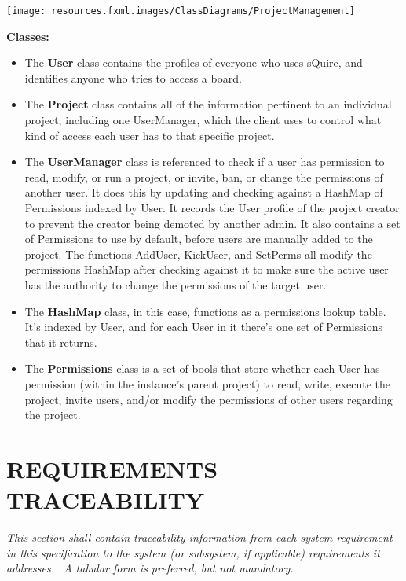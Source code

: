 \documentclass[twoside,letterpaper]{article}
\begin{document}
{\texttt{[image: resources.fxml.images/ClassDiagrams/ProjectManagement]}

\textbf{Classes:}
\begin{itemize}

	\item The \textbf{User} class contains the profiles of everyone who uses sQuire, and identifies anyone who tries to access a board.
	\item The \textbf{Project} class contains all of the information pertinent to an individual project, including one UserManager, which the client uses to control what kind of access each user has to that specific project.
	\item The \textbf{UserManager} class is referenced to check if a user has permission to read, modify, or run a project, or invite, ban, or change the permissions of another user. It does this by updating and checking against a HashMap of Permissions indexed by User. It records the User profile of the project creator to prevent the creator being demoted by another admin. It also contains a set of Permissions to use by default, before users are manually added to the project.
	The functions AddUser, KickUser, and SetPerms all modify the permissions HashMap after checking against it to make sure the active user has the authority to change the permissions of the target user.
	\item The \textbf{HashMap} class, in this case, functions as a permissions lookup table. It's indexed by User, and for each User in it there's one set of Permissions that it returns.
	\item The \textbf{Permissions} class is a set of bools that store whether each User has permission (within the instance's parent project) to read, write, execute the project, invite users, and/or modify the permissions of other users regarding the project.
\end{itemize}

\newpage

\subparagraph[]{\rmfamily\color{black} }
\clearpage\setcounter{page}{1}\pagestyle{Convertvi}
\section[REQUIREMENTS TRACEABILITY]{\rmfamily\bfseries\color{black} REQUIREMENTS TRACEABILITY}
\hypertarget{RefHeading28459017292}{}{\itshape\color{black}
This section shall contain traceability information from each system requirement in this specification to the system (or
subsystem, if applicable) requirements it addresses. \ A tabular form is preferred, but not mandatory.}


}
\end{document}
